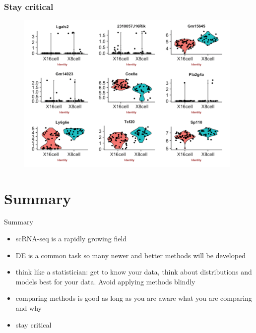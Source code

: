 \documentclass{beamer}\usepackage[]{graphicx}\usepackage[]{color}
\begin{document}
\begin{frame}
\frametitle{Stay critical}
\begin{center}
\begin{figure}
\includegraphics[width=11cm]{Images/asa1.png}
\end{figure}
\end{center}
\end{frame}

\section{Summary}
\begin{frame}
\begin{center}
\insertsection
\end{center}
\end{frame}

\begin{frame}
\begin{block}{Summary}
\begin{itemize}
\item scRNA-seq is a rapidly growing field
\item DE is a common task so many newer and better methods will be developed
\item think like a statistician: get to know your data, think about distributions and models best for your data. Avoid applying methods blindly
\item comparing methods is good as long as you are aware what you are comparing and why
\item stay critical
\end{itemize}
\end{block}
\end{frame}
\end{document}
